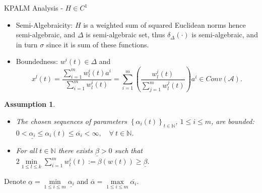 \documentclass[9pt,handout]{beamer} %
\newtheorem{assumption}{Assumption}
\newcommand{\nn}{\mathbb{N}} %
\begin{document}
	\begin{frame}{KPALM Analysis - $H \in C^1$}
		\begin{itemize}[<+->]
			\item Semi-Algebraicity: $H$ is a weighted sum of squared Euclidean norms hence semi-algebraic, and $\Delta$ is semi-algebraic set, thus $\delta_{\Delta}(\cdot)$ is semi-algebraic, and in turn $\sigma$ since it is sum of these functions.
			\item Boundedness: $w^i(t) \in \Delta$ and 
				\begin{equation*}
					x^l(t) = \frac{\sum_{i=1}^{m} w^i_l(t) a^i}{\sum_{i=1}^{m} w^i_l(t)} 
					= \sum_{i=1}^{m} \left( \frac{ w^i_l(t)}{\sum_{j=1}^{m} w^j_l(t)} \right) a^i \in Conv(\mathcal{A}).
				\end{equation*}
		\end{itemize}
		\pause
		\begin{assumption} \label{AssumptionsB}
            \begin{itemize}
                \item[$\rm{(i)}$] The chosen sequences of parameters $\left\{ \alpha_i(t) \right\}_{t \in \nn}$, $1 \leq i \leq m$, are bounded: $0 < \underline{\alpha_i} \leq \alpha_i(t) \leq \overline{\alpha_i} < \infty, \quad \forall \: t \in \nn$.
                \item[$\rm{(ii)}$] For all $t \in \mathbb{N}$ there exists $\underline{\beta} > 0$ such that $2\min\limits_{1 \leq l \leq k} \sum\limits_{i=1}^{m} w^i_l(t) := \beta(w(t)) \geq \underline{\beta}$.
            \end{itemize}
        \end{assumption}
        \pause
        Denote $\underline{\alpha}=\min\limits_{1 \leq i \leq m} \underline{\alpha_i}$ and $\overline{\alpha}=\max\limits_{1 \leq i \leq m} \overline{\alpha_i}$.
	\end{frame}
	
\end{document}
